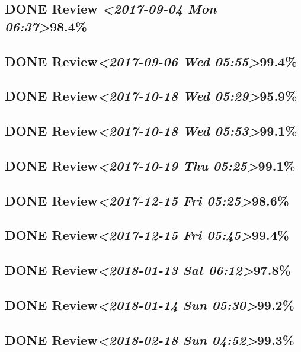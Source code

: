 \documentclass[11pt]{ctexart}
\begin{document}
\subsection{{\bfseries\sffamily DONE} Review \textit{<2017-09-04 Mon 06:37>}98.4\%}
\label{sec:org08e1592}
\subsection{{\bfseries\sffamily DONE} Review\textit{<2017-09-06 Wed 05:55>}99.4\%}
\label{sec:org7ffaf16}
\subsection{{\bfseries\sffamily DONE} Review\textit{<2017-10-18 Wed 05:29>}95.9\%}
\label{sec:orgaf8ec59}
\subsection{{\bfseries\sffamily DONE} Review\textit{<2017-10-18 Wed 05:53>}99.1\%}
\label{sec:orgfd15505}
\subsection{{\bfseries\sffamily DONE} Review\textit{<2017-10-19 Thu 05:25>}99.1\%}
\label{sec:org39b0a06}

\subsection{{\bfseries\sffamily DONE} Review\textit{<2017-12-15 Fri 05:25>}98.6\%}
\label{sec:org0d7ca08}
\subsection{{\bfseries\sffamily DONE} Review\textit{<2017-12-15 Fri 05:45>}99.4\%}
\label{sec:org9662077}
\subsection{{\bfseries\sffamily DONE} Review\textit{<2018-01-13 Sat 06:12>}97.8\%}
\label{sec:org45953ca}
\subsection{{\bfseries\sffamily DONE} Review\textit{<2018-01-14 Sun 05:30>}99.2\%}
\label{sec:orgbbd5cb0}
\subsection{{\bfseries\sffamily DONE} Review\textit{<2018-02-18 Sun 04:52>}99.3\%}
\label{sec:orgb48e6ee}
\end{document}
